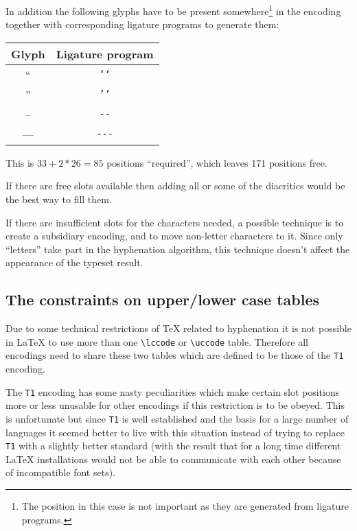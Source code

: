 \documentclass{ltxguide}[1994/11/20]
\providecommand{\Enc}[1]{\texttt{#1}}
\begin{document}
In addition the following glyphs have to be present
somewhere\footnote{The position in this case is not important as they
are generated from ligature programs.} in the encoding together with
corresponding ligature programs to generate them:
\begin{center}
\begin{tabular}[t]{cc}
Glyph   & Ligature program \\ \hline
 ``     & \texttt{`\/`} \\
 ''     & \texttt{'\/'} \\
 --     & \texttt{-\/-} \\
 ---    & \texttt{-\/-\/-} \\
\end{tabular}
\end{center}

This is $33 + 2 * 26 = 85$ positions ``required'', which leaves 171
positions free.

If there are free slots available then adding all or some of the
diacritics would be the best way to fill them.

If there are insufficient slots for the characters needed, a possible
technique is to create a subsidiary encoding, and to move non-letter
characters to it.  Since only ``letters'' take part in the hyphenation
algorithm, this technique doesn't affect the appearance of the typeset
result.

\subsection{The constraints on upper/lower case tables}

Due to some technical restrictions of \TeX{} related to hyphenation it
is not possible in \LaTeX{} to use more than one \verb=\lccode= or
\verb=\uccode= table. Therefore all encodings need to share these two
tables which are defined to be those of the \Enc{T1} encoding.

The \Enc{T1} encoding has some nasty peculiarities which make certain slot
positions more or less unusable for other encodings if this
restriction is to be obeyed. This is unfortunate but since \Enc{T1} is well
established and the basis for a large number of languages it seemed
better to live with this situation instead of trying to replace \Enc{T1} with a
slightly better standard (with the result that for a long time
different \LaTeX{} installations would not be able to communicate with
each other because of incompatible font sets).
\end{document}
